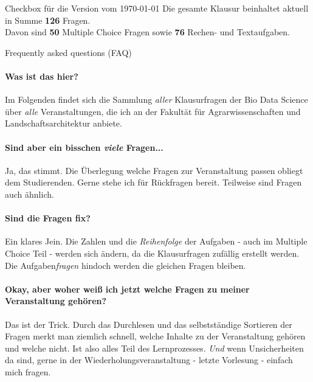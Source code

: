 \documentclass[a4paper, 10pt]{scrartcl}\usepackage[]{graphicx}\usepackage[]{xcolor}
\begin{document}

\begin{graybox}{Checkbox für die Version vom \today}
  \Large Die gesamte Klausur beinhaltet aktuell in Summe
  \textbf{126}
  Fragen.\\[1Ex]
  Davon sind \textbf{50} Multiple
  Choice Fragen sowie \textbf{76} Rechen- und
  Textaufgaben.
\end{graybox}

\vfill

\begin{takehomebox}{Frequently asked questions (FAQ)}
  \paragraph{Was ist das hier?} Im Folgenden findet sich die Sammlung
  \textit{aller} Klausurfragen der Bio Data Science über \textit{alle}
  Veranstaltungen, die ich an der Fakultät für Agrarwissenschaften und
  Landschaftsarchitektur anbiete.
  \vspace{1Ex}
  \paragraph{Sind aber ein bisschen \textit{viele} Fragen...} Ja, das
  stimmt. Die Überlegung welche Fragen zur Veranstaltung
  passen obliegt dem Studierenden. Gerne stehe ich für Rückfragen
  bereit. Teilweise sind Fragen auch ähnlich.
  \vspace{1Ex}
  \paragraph{Sind die Fragen fix?} Ein klares Jein. Die Zahlen und die
  \textit{Reihenfolge} der Aufgaben - auch im Multiple Choice Teil - werden
  sich ändern, da die Klausurfragen zufällig erstellt werden. Die
  Aufgaben\textit{fragen} hindoch werden die gleichen Fragen bleiben.
  \vspace{1Ex}
  \paragraph{Okay, aber woher weiß ich jetzt welche Fragen zu meiner
    Veranstaltung gehören?} Das ist der Trick. Durch das Durchlesen und das
  selbstständige Sortieren der Fragen merkt man
  ziemlich schnell, welche Inhalte zu der Veranstaltung gehören und welche
  nicht. Ist also alles Teil des Lernprozesses. \textit{Und} wenn
  Unsicherheiten da sind, gerne in der Wiederholungsveranstaltung - letzte
  Vorlesung - einfach mich fragen.
  \vspace{1Ex}

\end{takehomebox}
\end{document}

